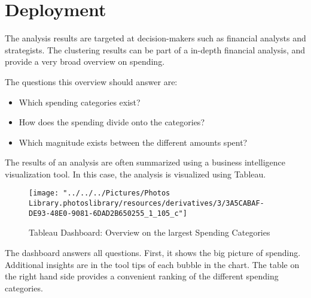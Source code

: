 
\chapter{Deployment}
	The analysis results are targeted at decision-makers such as financial analysts and strategists. The clustering results can be part of a in-depth financial analysis, and provide a very broad overview on spending.
	
	The questions this overview should answer are:
	\begin{itemize}
		\item Which spending categories exist?
		\item How does the spending divide onto the categories?
		\item Which magnitude exists between the different amounts spent?
	\end{itemize}
	
	The results of an analysis are often summarized using a business intelligence visualization tool. In this case, the analysis is visualized using Tableau.
\begin{figure}[h!]
	\centering
	\texttt{[image: "../../../Pictures/Photos Library.photoslibrary/resources/derivatives/3/3A5CABAF-DE93-48E0-9081-6DAD2B650255\_1\_105\_c"]}
	\caption{Tableau Dashboard: Overview on the largest Spending Categories}
	\label{fig:dashboard}
\end{figure}

	The dashboard answers all questions. First, it shows the big picture of spending. Additional insights are in the tool tips of each bubble in the chart. The table on the right hand side provides a convenient ranking of the different spending categories.
	
